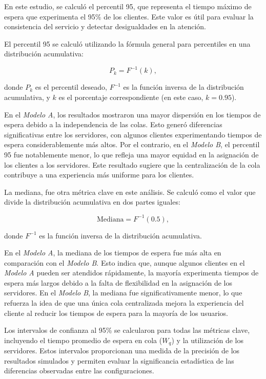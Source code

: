 \documentclass[a4paper,12pt]{article}
\begin{document}
En este estudio, se calculó el percentil 95, que representa el tiempo máximo de espera que experimenta el 95\% de los clientes. Este valor es útil para evaluar la consistencia del servicio y detectar desigualdades en la atención.

El percentil 95 se calculó utilizando la fórmula general para percentiles en una distribución acumulativa:

\[
P_k = F^{-1}(k),
\]

donde \( P_k \) es el percentil deseado, \( F^{-1} \) es la función inversa de la distribución acumulativa, y \( k \) es el porcentaje correspondiente (en este caso, \( k = 0.95 \)).

En el \textit{Modelo A}, los resultados mostraron una mayor dispersión en los tiempos de espera debido a la independencia de las colas. Esto generó diferencias significativas entre los servidores, con algunos clientes experimentando tiempos de espera considerablemente más altos. Por el contrario, en el \textit{Modelo B}, el percentil 95 fue notablemente menor, lo que refleja una mayor equidad en la asignación de los clientes a los servidores. Este resultado sugiere que la centralización de la cola contribuye a una experiencia más uniforme para los clientes.

La mediana, fue otra métrica clave en este análisis. Se calculó como el valor que divide la distribución acumulativa en dos partes iguales:

\[
\text{Mediana} = F^{-1}(0.5),
\]

donde \( F^{-1} \) es la función inversa de la distribución acumulativa.

En el \textit{Modelo A}, la mediana de los tiempos de espera fue más alta en comparación con el \textit{Modelo B}. Esto indica que, aunque algunos clientes en el \textit{Modelo A} pueden ser atendidos rápidamente, la mayoría experimenta tiempos de espera más largos debido a la falta de flexibilidad en la asignación de los servidores. En el \textit{Modelo B}, la mediana fue significativamente menor, lo que refuerza la idea de que una única cola centralizada mejora la experiencia del cliente al reducir los tiempos de espera para la mayoría de los usuarios.

Los intervalos de confianza al 95\% se calcularon para todas las métricas clave, incluyendo el tiempo promedio de espera en cola (\( W_q \)) y la utilización de los servidores. Estos intervalos proporcionan una medida de la precisión de los resultados simulados y permiten evaluar la significancia estadística de las diferencias observadas entre las configuraciones.
\end{document}
